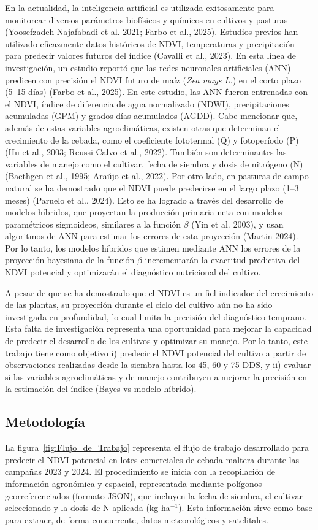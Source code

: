 \documentclass[
11pt, %
]{charter}
\begin{document}
En la actualidad, la inteligencia artificial es utilizada exitosamente para monitorear diversos parámetros biofísicos y químicos en cultivos y pasturas (Yoosefzadeh-Najafabadi et al. 2021; Farbo et al., 2025). Estudios previos han utilizado eficazmente datos históricos de NDVI, temperaturas y precipitación para predecir valores futuros del índice (Cavalli et al., 2023). En esta línea de investigación, un estudio reportó que las redes neuronales artificiales (ANN) predicen con precisión el NDVI futuro de maíz (\emph{Zea mays L.}) en el corto plazo (5–15 días) (Farbo et al., 2025). En este estudio, las ANN fueron entrenadas con el NDVI, índice de diferencia de agua normalizado (NDWI), precipitaciones acumuladas (GPM) y grados días acumulados (AGDD). Cabe mencionar que, además de estas variables agroclimáticas, existen otras que determinan el crecimiento de la cebada, como el coeficiente fototermal (Q) y fotoperíodo (P) (Hu et al., 2003; Reussi Calvo et al., 2022). También son determinantes las variables de manejo como el cultivar, fecha de siembra y dosis de nitrógeno (N) (Baethgen et al., 1995; Araújo et al., 2022). Por otro lado, en pasturas de campo natural se ha demostrado que el NDVI puede predecirse en el largo plazo (1–3 meses) (Paruelo et al., 2024). Esto se ha logrado a través del desarrollo de modelos híbridos, que proyectan la producción primaria neta con modelos paramétricos sigmoideos, similares a la función $\beta$ (Yin et al. 2003), y usan algoritmos de ANN para estimar los errores de esta proyección (Martin 2024). Por lo tanto, los modelos híbridos que estimen mediante ANN los errores de la proyección bayesiana de la función $\beta$ incrementarán la exactitud predictiva del NDVI potencial y optimizarán el diagnóstico nutricional del cultivo.

A pesar de que se ha demostrado que el NDVI es un fiel indicador del crecimiento de las plantas, su proyección durante el ciclo del cultivo aún no ha sido investigada en profundidad, lo cual limita la precisión del diagnóstico temprano. Esta falta de investigación representa una oportunidad para mejorar la capacidad de predecir el desarrollo de los cultivos y optimizar su manejo. Por lo tanto, este trabajo tiene como objetivo i) predecir el NDVI potencial del cultivo a partir de observaciones realizadas desde la siembra hasta los 45, 60 y 75 DDS, y ii) evaluar si las variables agroclimáticas y de manejo contribuyen a mejorar la precisión en la estimación del índice (Bayes vs modelo híbrido).

\subsection{Metodología}
\label{sec:descripcion}
La figura~\ref{fig:Flujo_de_Trabajo} representa el flujo de trabajo desarrollado para predecir el NDVI potencial en lotes comerciales de cebada maltera durante las campañas 2023 y 2024. El procedimiento se inicia con la recopilación de información agronómica y espacial, representada mediante polígonos georreferenciados (formato JSON), que incluyen la fecha de siembra, el cultivar seleccionado y la dosis de N aplicada (kg ha$^{-1}$). Esta información sirve como base para extraer, de forma concurrente, datos meteorológicos y satelitales. 
\end{document}

